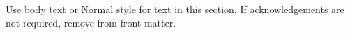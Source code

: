 
Use body text or Normal style for text in this section.
If acknowledgements are not required, remove from front matter.
